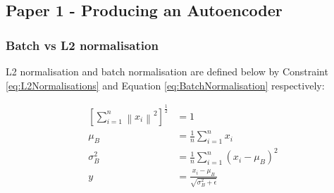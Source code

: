 \documentclass[12pt,onecolumn,letterpaper]{article}
\begin{document}
\subsection{Paper 1 - Producing an Autoencoder}

\subsubsection{Batch vs L2 normalisation}

L2 normalisation and batch normalisation are defined below by Constraint \ref{eq:L2Normalisations} and Equation \ref{eq:BatchNormalisation} respectively:

\begin{subequations}
\begin{align}
   \left[\sum_{i=1}^{n}\left \| x_i \right \|^2\right]^{\frac{1}{2}} &= 1 \label{eq:L2Normalisations}\\
   \mu_B &= \frac{1}{n} \sum_{i=1}^{n}x_i \\
   \sigma_B^2 &= \frac{1}{n} \sum_{i=1}^{n} \left(x_i - \mu_B \right)^2 \\
   y &= \frac{x_i - \mu_B}{\sqrt{\sigma_B^2 + \epsilon}}
   \label{eq:BatchNormalisation}
\end{align}
\end{subequations}
\end{document}
